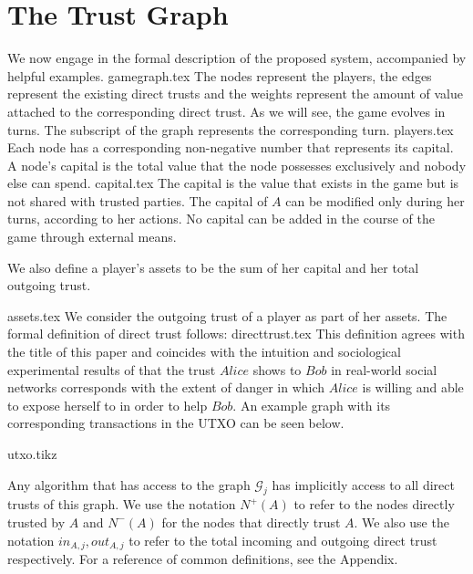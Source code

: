 \section{The Trust Graph}
  We now engage in the formal description of the proposed system, accompanied by helpful examples.
  {gamegraph.tex}
  The nodes represent the players, the edges represent the existing direct trusts and the weights represent the amount of
  value attached to the corresponding direct trust. As we will see, the game evolves in turns. The subscript of the graph
  represents the corresponding turn.
  {players.tex}
  Each node has a corresponding non-negative number that represents its capital. A node's capital is the total value that
  the node possesses exclusively and nobody else can spend.
  {capital.tex}
  The capital is the value that exists in the game but is not shared with trusted parties. The capital of $A$ can be
  modified only during her turns, according to her actions. No capital can be added in the course of the game through
  external means.

  We also define a player's assets to be the sum of her capital and her total outgoing trust.

  {assets.tex}
  We consider the outgoing trust of a player as part of her assets. The formal definition of direct trust follows:
  {directtrust.tex}
  This definition agrees with the title of this paper and coincides with the intuition and sociological experimental results
  of \cite{kmrs} that the trust $Alice$ shows to $Bob$ in real-world social networks corresponds with the extent
  of danger in which $Alice$ is willing and able to expose herself to in order to help $Bob$. An example graph with its
  corresponding transactions in the UTXO can be seen below.

  {utxo.tikz}

  Any algorithm that has access to the graph $\mathcal{G}_j$ has implicitly access to all direct trusts of this graph.
  We use the notation $N^{+}(A)$ to refer to the nodes directly trusted by $A$ and $N^{-}(A)$ for the nodes that directly
  trust $A$. We also use the notation $in_{A, j}, out_{A, j}$ to refer to the total incoming and outgoing direct trust
  respectively. For a reference of common definitions, see the Appendix.
